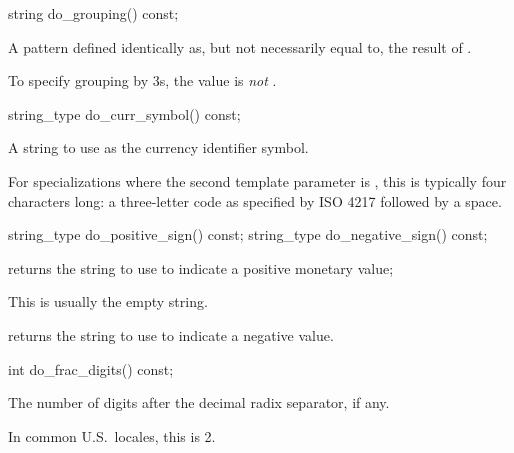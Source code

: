 %
\begin{itemdecl}
string do_grouping() const;
\end{itemdecl}

\begin{itemdescr}
\pnum
\returns
A pattern defined identically as, but not necessarily equal to,
the result of .
\begin{footnote}
To specify grouping by 3s,
the value is  \textit{not} .
\end{footnote}
\end{itemdescr}

%
\begin{itemdecl}
string_type do_curr_symbol() const;
\end{itemdecl}

\begin{itemdescr}
\pnum
\returns
A string to use as the currency identifier symbol.
\begin{note}
For specializations where the second template parameter is ,
this is typically four characters long:
a three-letter code as specified by ISO 4217\supercite{iso4217}
followed by a space.
\end{note}
\end{itemdescr}

%
%
\begin{itemdecl}
string_type do_positive_sign() const;
string_type do_negative_sign() const;
\end{itemdecl}

\begin{itemdescr}
\pnum
\returns
{}
returns the string to use to indicate a positive monetary value;
\begin{footnote}
This is usually the empty string.
\end{footnote}
returns the string to use to indicate a negative value.
\end{itemdescr}

%
\begin{itemdecl}
int do_frac_digits() const;
\end{itemdecl}

\begin{itemdescr}
\pnum
\returns
The number of digits after the decimal radix separator, if any.
\begin{footnote}
In common U.S.\ locales, this is 2.
\end{footnote}
\end{itemdescr}

